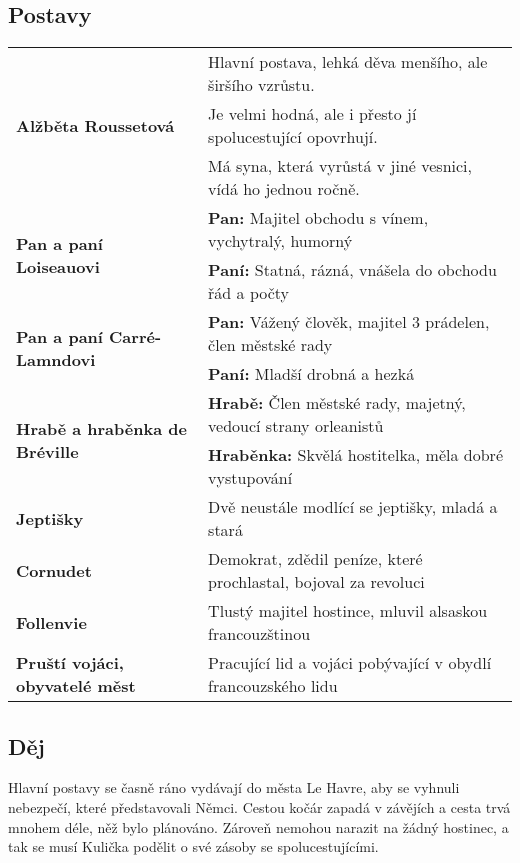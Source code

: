     \subsection*{Postavy}
        \begin{center}
            \begin{tabular}{l|l}
                \multirow{3}{15em}{\textbf{Alžběta Roussetová}} & Hlavní postava, lehká děva menšího, ale širšího vzrůstu. \\
                & Je velmi hodná, ale i přesto jí spolucestující opovrhují. \\
                & Má syna, která vyrůstá v jiné vesnici, vídá ho jednou ročně. \\
                \hline
                \multirow{2}{15em}{\textbf{Pan a paní Loiseauovi}} & \textbf{Pan:} Majitel obchodu s vínem, vychytralý, humorný \\
                & \textbf{Paní:} Statná, rázná, vnášela do obchodu řád a počty \\
                \hline
                \multirow{2}{15em}{\textbf{Pan a paní Carré-Lamndovi}} & \textbf{Pan:} Vážený člověk, majitel 3 prádelen, člen městské rady \\
                & \textbf{Paní:} Mladší drobná a hezká \\
                \hline
                \multirow{2}{15em}{\textbf{Hrabě a hraběnka de Bréville}} & \textbf{Hrabě:} Člen městské rady, majetný, vedoucí strany orleanistů\\
                & \textbf{Hraběnka:} Skvělá hostitelka, měla dobré vystupování \\
                \hline
                \textbf{Jeptišky} & Dvě neustále modlící se jeptišky, mladá a stará \\
                \hline
                \textbf{Cornudet} & Demokrat, zdědil peníze, které prochlastal, bojoval za revoluci \\
                \hline
                \textbf{Follenvie} & Tlustý majitel hostince, mluvil alsaskou francouzštinou \\
                \hline
                \textbf{Pruští vojáci, obyvatelé měst} & Pracující lid a vojáci pobývající v obydlí francouzského lidu \\
            \end{tabular}
        \end{center}
    \subsection*{Děj}
        Hlavní postavy se časně ráno vydávají do města Le Havre, aby se vyhnuli nebezpečí, které představovali Němci.
        Cestou kočár zapadá v závějích a cesta trvá mnohem déle, něž bylo plánováno.
        Zároveň nemohou narazit na žádný hostinec, a tak se musí Kulička podělit o své zásoby se spolucestujícími.

